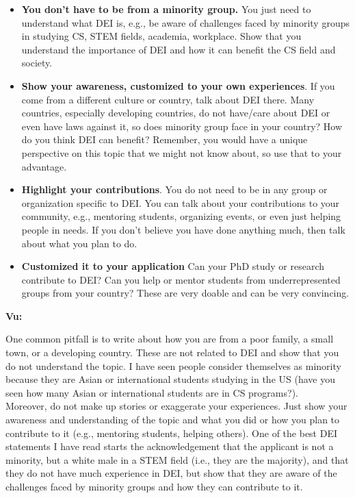 \documentclass[oneside,11pt,dvipsnames]{book}
\newenvironment{commentbox}[1][]{
  \small
  \begin{mybox}
    {\small \textbf{#1}}
  }{
  \end{mybox}
}
\begin{document}
\begin{itemize}
\item \textbf{You don't have to be from a minority group.} You just need to understand what DEI is, e.g., be aware of challenges faced by minority groups in studying CS, STEM fields, academia, workplace. Show that you understand the importance of DEI and how it can benefit the CS field and society. 

\item \textbf{Show your awareness, customized to your own experiences}. If you come from a different culture or country, talk about DEI there. Many countries, especially developing countries, do not have/care about DEI or even have laws against it, so does minority group face in your country?  How do you think DEI can benefit? Remember, you would have a unique perspective on this topic that we might not know about, so use that to your advantage.

\item \textbf{Highlight your contributions}.  You do not need to be in any group or organization specific to DEI.  You can talk about your contributions to your community, e.g., mentoring students, organizing events, or even just helping people in needs. If you don't believe you have done anything much, then talk about what you plan to do. 

\item \textbf{Customized it to your application} Can your PhD study or research contribute to DEI?  Can you help or mentor students from underrepresented groups from your country?  These are very doable and can be very convincing.  

\end{itemize}


\begin{commentbox}[Vu:]
One common pitfall is to write about how you are from a poor family, a small town, or a developing country.  These are not related to DEI and show that you do not understand the topic.   I have seen people consider themselves as minority because they are Asian or international students studying in the US (have you seen how many Asian or international students are in CS programs?).\\

Moreover, do not make up stories or exaggerate your experiences.  Just show your awareness and understanding of the topic and what you did or how you plan to contribute to it (e.g., mentoring students, helping others). One of the best DEI statements I have read starts the acknowledgement that the applicant is not a minority, but a white male in a STEM field (i.e., they are the majority), and that they do not have much experience in DEI, but show that they are aware of the challenges faced by minority groups and how they can contribute to it.
\end{commentbox}
\end{document}
